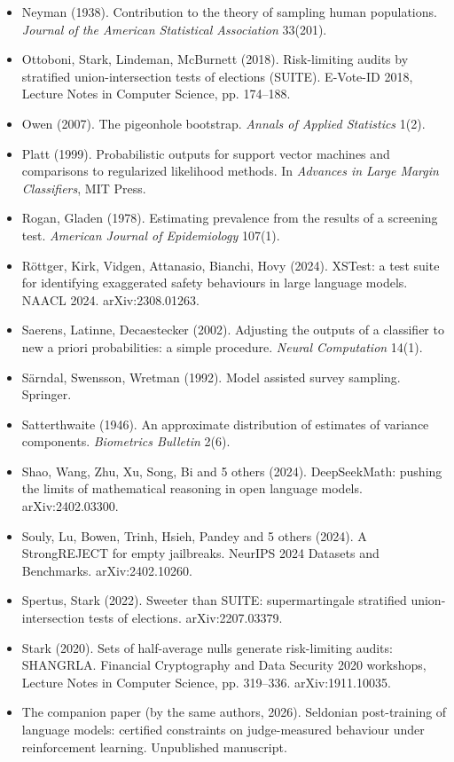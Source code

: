 \documentclass[11pt]{article}
\begin{document}
\begin{itemize}
\item Neyman (1938). Contribution to the theory of sampling human populations. \emph{Journal of the American Statistical Association} 33(201).
\item Ottoboni, Stark, Lindeman, McBurnett (2018). Risk-limiting audits by stratified union-intersection tests of elections (SUITE). E-Vote-ID 2018, Lecture Notes in Computer Science, pp. 174--188.
\item Owen (2007). The pigeonhole bootstrap. \emph{Annals of Applied Statistics} 1(2).
\item Platt (1999). Probabilistic outputs for support vector machines and comparisons to regularized likelihood methods. In \emph{Advances in Large Margin Classifiers}, MIT Press.
\item Rogan, Gladen (1978). Estimating prevalence from the results of a screening test. \emph{American Journal of Epidemiology} 107(1).
\item Röttger, Kirk, Vidgen, Attanasio, Bianchi, Hovy (2024). XSTest: a test suite for identifying exaggerated safety behaviours in large language models. NAACL 2024. arXiv:2308.01263.
\item Saerens, Latinne, Decaestecker (2002). Adjusting the outputs of a classifier to new a priori probabilities: a simple procedure. \emph{Neural Computation} 14(1).
\item Särndal, Swensson, Wretman (1992). Model assisted survey sampling. Springer.
\item Satterthwaite (1946). An approximate distribution of estimates of variance components. \emph{Biometrics Bulletin} 2(6).
\item Shao, Wang, Zhu, Xu, Song, Bi and 5 others (2024). DeepSeekMath: pushing the limits of mathematical reasoning in open language models. arXiv:2402.03300.
\item Souly, Lu, Bowen, Trinh, Hsieh, Pandey and 5 others (2024). A StrongREJECT for empty jailbreaks. NeurIPS 2024 Datasets and Benchmarks. arXiv:2402.10260.
\item Spertus, Stark (2022). Sweeter than SUITE: supermartingale stratified union-intersection tests of elections. arXiv:2207.03379.
\item Stark (2020). Sets of half-average nulls generate risk-limiting audits: SHANGRLA. Financial Cryptography and Data Security 2020 workshops, Lecture Notes in Computer Science, pp. 319--336. arXiv:1911.10035.
\item The companion paper (by the same authors, 2026). Seldonian post-training of language models: certified constraints on judge-measured behaviour under reinforcement learning. Unpublished manuscript.

\end{itemize}
\end{document}
